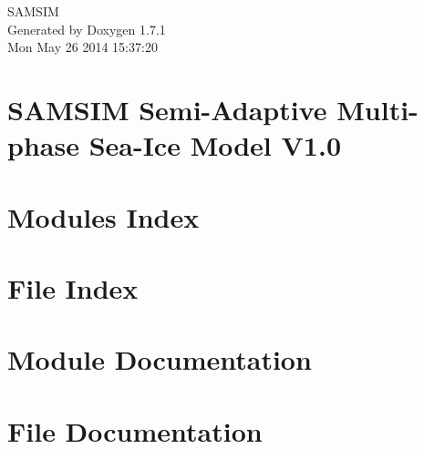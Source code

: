 \documentclass[a4paper]{book}
\begin{document}
\hypersetup{pageanchor=false}
\begin{titlepage}
\vspace*{7cm}
\begin{center}
{\Large SAMSIM }\\
\vspace*{1cm}
{\large Generated by Doxygen 1.7.1}\\
\vspace*{0.5cm}
{\small Mon May 26 2014 15:37:20}\\
\end{center}
\end{titlepage}
\clearemptydoublepage
{}
\tableofcontents
\clearemptydoublepage
{}
\hypersetup{pageanchor=true}
\chapter{SAMSIM Semi-\/Adaptive Multi-\/phase Sea-\/Ice Model V1.0}
\label{index}\hypertarget{index}{}
\chapter{Modules Index}

\chapter{File Index}

\chapter{Module Documentation}














\chapter{File Documentation}

















\printindex
\end{document}
